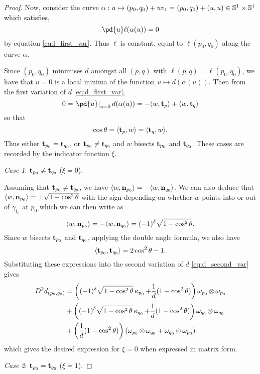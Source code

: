 \documentclass[11pt]{amsart}
\begin{document}
\begin{proof}
Now, consider the curve $\alpha: u \mapsto (p_0,q_0) + uv_1 = (p_0,q_0) + (u, u) \in \mathbb{S}^1\times \mathbb{S}^1$ which satisfies,
\[
\pd{u} \ell(\alpha(u)) = 0 
\]
by equation \eqref{eq:l_first_var}. Thus $\ell$ is constant, equal to $\ell(p_0, q_0)$ along the curve $\alpha$. 

Since $(p_0, q_0)$ minimises $d$ amongst all $(p,q)$ with $\ell(p, q) = \ell(p_0, q_0)$, we have that $u=0$ is a local minima of the function $u\mapsto d(\alpha(u))$. Then from the first variation of $d$ \eqref{eq:d_first_var},
\[
0 = \left.\pd{u}\right|_{u=0} d(\alpha(u)) = -\ip{w}{\tang_p} + \ip{w}{\tang_q}
\]
so that
\[
\cos\theta = \langle{\operatorname{\mathbf{t}}_p},{w}\rangle = \langle{\operatorname{\mathbf{t}}_q},{w}\rangle.
\]
Thus either $\operatorname{\mathbf{t}}_{p_0} = \operatorname{\mathbf{t}}_{q_0}$, or $\operatorname{\mathbf{t}}_{p_0} \ne \operatorname{\mathbf{t}}_{q_0}$ and $w$ bisects $\operatorname{\mathbf{t}}_{p_0}$ and $\operatorname{\mathbf{t}}_{q_0}$. These cases are recorded by the indicator function $\xi$. 

\emph{Case 1}: $\operatorname{\mathbf{t}}_{p_0} \ne \operatorname{\mathbf{t}}_{q_0}$ ($\xi = 0$).

Assuming that $\operatorname{\mathbf{t}}_{p_0} \ne \operatorname{\mathbf{t}}_{q_0}$, we have $\langle{w},{\operatorname{\mathbf{n}}_{p_0}}\rangle = - \langle{w},{\operatorname{\mathbf{n}}_{q_0}}\rangle$. We can also deduce that $\langle{w},{\operatorname{\mathbf{n}}_{p_0}}\rangle = \pm \sqrt{1-\cos^2\theta}$ with the sign depending on whether $w$ points into or out of $\gamma_{t_0}$ at $p_0$ which we can then write as
\[
\langle{w},{\operatorname{\mathbf{n}}_{p_0}}\rangle = -\langle{w},{\operatorname{\mathbf{n}}_{q_0}}\rangle = (-1)^\delta \sqrt{1-\cos^2\theta}.
\]
Since $w$ bisects $\operatorname{\mathbf{t}}_{p_0}$ and $\operatorname{\mathbf{t}}_{q_0}$, applying the double angle formula, we also have 
\[
\langle{\operatorname{\mathbf{t}}_{p_0}},{\operatorname{\mathbf{t}}_{q_0}}\rangle = 2\cos^2\theta - 1.
\]
Substituting these expressions into the second variation of $d$ \eqref{eq:d_second_var} gives
\begin{align*}
D^2d_{(p_0,q_0)} &=  \left((-1)^{\delta} \sqrt{1-\cos^2\theta}\operatorname{\kappa}_{p_0} + \frac{1}{d}(1 - \cos^2\theta) \right) \omega_{p_0} \operatorname{\otimes} \omega_{p_0} \\
&+ \left((-1)^{\delta} \sqrt{1-\cos^2\theta} \operatorname{\kappa}_{q_0} + \frac{1}{d}(1 - \cos^2\theta) \right) \omega_{q_0} \operatorname{\otimes} \omega_{q_0} \\
&+ \left(\frac{1}{d}(1 - \cos^2\theta) \right) \left(\omega_{p_0} \operatorname{\otimes} \omega_{q_0} + \omega_{q_0} \operatorname{\otimes} \omega_{p_0} \right)
\end{align*}
which gives the desired expression for $\xi=0$ when expressed in matrix form.

\emph{Case 2}: $\operatorname{\mathbf{t}}_{p_0} = \operatorname{\mathbf{t}}_{q_0}$ ($\xi = 1$).


\end{proof}
\end{document}
